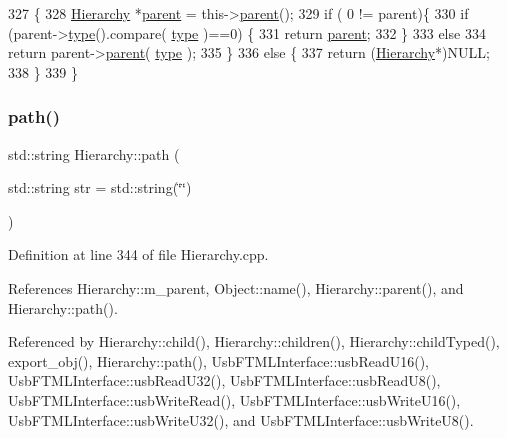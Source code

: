 \begin{DoxyCode}
327                                             \{
328   \hyperlink{classHierarchy}{Hierarchy} *\hyperlink{classHierarchy_a1c7bec8257e717f9c1465e06ebf845fc}{parent} = this->\hyperlink{classHierarchy_a1c7bec8257e717f9c1465e06ebf845fc}{parent}();
329   \textcolor{keywordflow}{if} ( 0 != parent)\{
330     \textcolor{keywordflow}{if} (parent->\hyperlink{classObject_a84f99f70f144a83e1582d1d0f84e4e62}{type}().compare( \hyperlink{classObject_a84f99f70f144a83e1582d1d0f84e4e62}{type} )==0) \{
331       \textcolor{keywordflow}{return} \hyperlink{classHierarchy_a1c7bec8257e717f9c1465e06ebf845fc}{parent};
332     \}
333     \textcolor{keywordflow}{else}
334       \textcolor{keywordflow}{return} parent->\hyperlink{classHierarchy_a1c7bec8257e717f9c1465e06ebf845fc}{parent}( \hyperlink{classObject_a84f99f70f144a83e1582d1d0f84e4e62}{type} );
335   \}
336   \textcolor{keywordflow}{else} \{
337     \textcolor{keywordflow}{return} (\hyperlink{classHierarchy}{Hierarchy}*)NULL;
338   \}
339 \}
\end{DoxyCode}
\mbox{\label{classHierarchy_aa7990fa7caf132d83e361ce033c6c65a}} 
\subsubsection{\texorpdfstring{path()}{path()}}
{\footnotesize\ttfamily std\+::string Hierarchy\+::path (\begin{DoxyParamCaption}\item[{std\+::string}]{str = {\ttfamily std\+:\+:string(\char`\"{}\char`\"{})} }\end{DoxyParamCaption})\hspace{0.3cm}{\ttfamily [inherited]}}



Definition at line 344 of file Hierarchy.\+cpp.



References Hierarchy\+::m\+\_\+parent, Object\+::name(), Hierarchy\+::parent(), and Hierarchy\+::path().



Referenced by Hierarchy\+::child(), Hierarchy\+::children(), Hierarchy\+::child\+Typed(), export\+\_\+obj(), Hierarchy\+::path(), Usb\+F\+T\+M\+L\+Interface\+::usb\+Read\+U16(), Usb\+F\+T\+M\+L\+Interface\+::usb\+Read\+U32(), Usb\+F\+T\+M\+L\+Interface\+::usb\+Read\+U8(), Usb\+F\+T\+M\+L\+Interface\+::usb\+Write\+Read(), Usb\+F\+T\+M\+L\+Interface\+::usb\+Write\+U16(), Usb\+F\+T\+M\+L\+Interface\+::usb\+Write\+U32(), and Usb\+F\+T\+M\+L\+Interface\+::usb\+Write\+U8().


